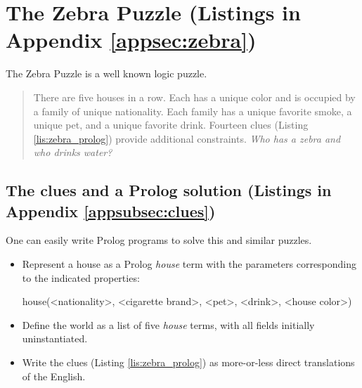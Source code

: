 \section{The Zebra Puzzle (Listings in Appendix \ref{appsec:zebra})}\label{sec:zebra}

The Zebra Puzzle is a well known logic puzzle.

\begin{quotation}
There are five houses in a row. Each has a unique color and is occupied by a family of unique nationality. Each family has a unique favorite smoke, a unique pet, and a unique favorite drink. Fourteen clues (Listing \ref{lis:zebra_prolog}) provide additional constraints. \textit{Who has a zebra and who drinks water?}
\end{quotation}

\subsection{The clues and a Prolog solution (Listings in Appendix \ref{appsubsec:clues})} \label{subsec:clues}

One can easily write Prolog programs to solve this and similar puzzles.
\begin{itemize}
\item Represent a house as a Prolog \textit{house} term with the parameters corresponding to the indicated properties:
\begin{python}
   house(<nationality>, <cigarette brand>, <pet>, <drink>, <house color>)
\end{python}
\item Define the world as a list of five \textit{house} terms, with all fields initially uninstantiated.

\item Write the clues (Listing \ref{lis:zebra_prolog}) as more-or-less direct translations of the English.
\end{itemize}



